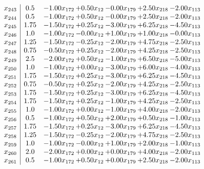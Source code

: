 \documentclass[8pt]{article}
\begin{document}
\[\begin{array}{c| c c@{\hskip 2pt} c@{\hskip 2pt} c@{\hskip 2pt} c@{\hskip 2pt} c@{\hskip 2pt} }
 x_{243}   &  0.5 & -1.00 x_{172} & +  0.50 x_{12} & -0.00 x_{179} & +  2.50 x_{218} & -2.00 x_{113}\\
 x_{244}   &  0.5 & -1.00 x_{172} & +  0.50 x_{12} & -0.00 x_{179} & +  2.50 x_{218} & -2.00 x_{113}\\
 x_{245}   &  1.75 & -1.50 x_{172} & +  0.25 x_{12} & -3.00 x_{179} & +  6.25 x_{218} & -4.50 x_{113}\\
 x_{246}   &  1.0 & -1.00 x_{172} & -0.00 x_{12} & +  1.00 x_{179} & +  1.00 x_{218} & -0.00 x_{113}\\
 x_{247}   &  1.25 & -1.50 x_{172} & -0.25 x_{12} & -2.00 x_{179} & +  4.75 x_{218} & -2.50 x_{113}\\
 x_{248}   &  0.75 & -0.50 x_{172} & +  0.25 x_{12} & -2.00 x_{179} & +  4.25 x_{218} & -2.50 x_{113}\\
 x_{249}   &  2.5 & -2.00 x_{172} & +  0.50 x_{12} & -1.00 x_{179} & +  6.50 x_{218} & -5.00 x_{113}\\
 x_{250}   &  1.0 & -1.00 x_{172} & +  0.00 x_{12} & -3.00 x_{179} & +  6.00 x_{218} & -4.00 x_{113}\\
 x_{251}   &  1.75 & -1.50 x_{172} & +  0.25 x_{12} & -3.00 x_{179} & +  6.25 x_{218} & -4.50 x_{113}\\
 x_{252}   &  0.75 & -0.50 x_{172} & +  0.25 x_{12} & -2.00 x_{179} & +  4.25 x_{218} & -2.50 x_{113}\\
 x_{253}   &  1.75 & -1.50 x_{172} & +  0.25 x_{12} & -3.00 x_{179} & +  6.25 x_{218} & -4.50 x_{113}\\
 x_{254}   &  1.75 & -1.50 x_{172} & +  0.25 x_{12} & -1.00 x_{179} & +  4.25 x_{218} & -2.50 x_{113}\\
 x_{255}   &  1.0 & -1.00 x_{172} & +  0.00 x_{12} & -1.00 x_{179} & +  4.00 x_{218} & -2.00 x_{113}\\
 x_{256}   &  0.5 & -1.00 x_{172} & +  0.50 x_{12} & +  2.00 x_{179} & +  0.50 x_{218} & -1.00 x_{113}\\
 x_{257}   &  1.75 & -1.50 x_{172} & +  0.25 x_{12} & -3.00 x_{179} & +  6.25 x_{218} & -4.50 x_{113}\\
 x_{258}   &  1.25 & -1.50 x_{172} & -0.25 x_{12} & -2.00 x_{179} & +  4.75 x_{218} & -2.50 x_{113}\\
 x_{259}   &  1.0 & -1.00 x_{172} & -0.00 x_{12} & +  1.00 x_{179} & +  2.00 x_{218} & -1.00 x_{113}\\
 x_{260}   &  2.0 & -2.00 x_{172} & +  0.00 x_{12} & +  0.00 x_{179} & +  4.00 x_{218} & -2.00 x_{113}\\
 x_{261}   &  0.5 & -1.00 x_{172} & +  0.50 x_{12} & +  0.00 x_{179} & +  2.50 x_{218} & -2.00 x_{113}\\

\end{array}\]
\end{document}
